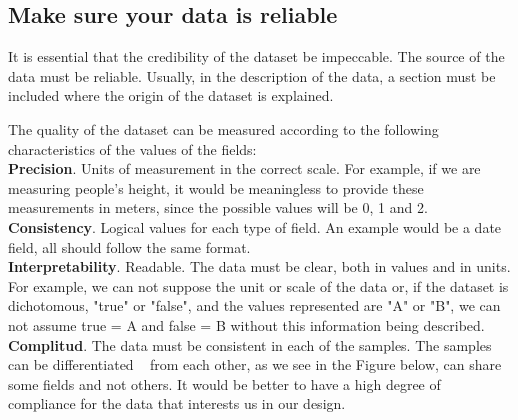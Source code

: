 \subsection{Make sure your data is reliable}
It is essential that the credibility of the dataset be impeccable. The source of the data must be reliable.
Usually, in the description of the data, a section must be included where the origin of the dataset is explained.

The quality of the dataset can be measured according to the following characteristics of the values of the fields: \\
 
\textbf{Precision}. Units of measurement in the correct scale. For example, if we are measuring people's height, it 
would be meaningless to provide these measurements in meters, since the possible values will be 0, 1 and 2. \\

\textbf{Consistency}. Logical values for each type of field. An example would be a date field, all should
follow the same format. \\

\textbf{Interpretability}. Readable. The data must be clear, both in values and in units. For example, we can not
suppose the unit or scale of the data or, if the dataset is dichotomous, "true" or "false", and the values represented are
"A" or "B", we can not assume true = A and false = B without this information being described. \\

\textbf{Complitud}. The data must be consistent in each of the samples. The samples can be differentiated
  from each other, as we see in the Figure below, can share some fields and not others. It would be
better to have a high degree of compliance for the data that interests us in our design.


